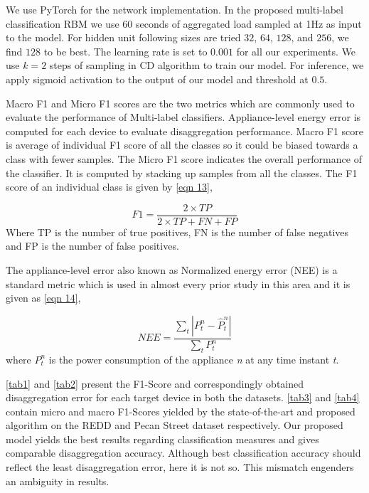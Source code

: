 \documentclass{article}
\begin{document}
 We use PyTorch\cite{paszke2017automatic} for the network implementation. In the proposed multi-label classification RBM we use 60 seconds of aggregated load sampled at 1Hz as input to the model. For hidden unit following sizes are tried $32$, $64$, $128$, and $256$, we find $128$ to be best. The learning rate is set to $0.001$ for all our experiments. We use $k=2$ steps of sampling in CD \cite{CD2002hinton} algorithm to train our model. For inference, we apply sigmoid activation to the output of our model and threshold at $0.5$.



Macro F1 and Micro F1 scores are the two metrics which are commonly used to evaluate the performance of Multi-label classifiers. Appliance-level energy error is computed for each device to evaluate disaggregation performance. Macro F1 score is average of individual F1 score of all the classes so it could be biased towards a class with fewer samples. The Micro F1 score indicates the overall performance of the classifier. It is computed by stacking up samples from all the classes. The F1 score of an individual class is given by \autoref{eqn 13},


\begin{equation}
\label{eqn 13}
F1=\frac{{2 \times TP}}{{2 \times TP + FN + FP}}
\end{equation}
Where TP is the number of true positives, FN is the number of false negatives and FP is the number of false positives.

The appliance-level error also known as Normalized energy error (NEE) is a standard metric which is used in almost every prior study in this area and it is given as \autoref{eqn 14},

\begin{equation}
\label{eqn 14}
NEE = \frac{{\sum\limits_t {|P_t^n - \hat P_t^n|} }}{{\sum\limits_t {P_t^n} }}
\end{equation}
where $P_t^n$ is the power consumption of the appliance \textit{n} at any time instant \textit{t}.



\autoref{tab1} and \autoref{tab2} present the F1-Score and correspondingly obtained disaggregation error for each target device in both the datasets. \autoref{tab3} and \autoref{tab4} contain micro and macro F1-Scores yielded by the state-of-the-art and proposed algorithm on the REDD and Pecan Street dataset respectively. Our proposed model yields the best results regarding classification measures and gives comparable disaggregation accuracy. Although best classification accuracy should reflect the least disaggregation error, here it is not so. This mismatch engenders an ambiguity in results. 
\end{document}
